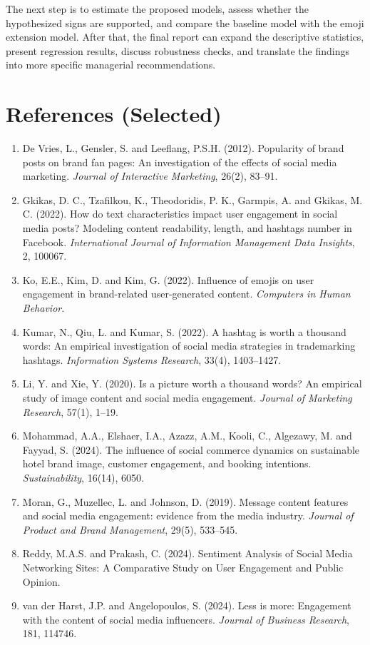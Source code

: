 \documentclass[12pt,a4paper]{ctexart}
\begin{document}
The next step is to estimate the proposed models, assess whether the hypothesized signs are supported, and compare the baseline model with the emoji extension model. After that, the final report can expand the descriptive statistics, present regression results, discuss robustness checks, and translate the findings into more specific managerial recommendations.

\section{References (Selected)}
\begin{enumerate}
    \item De Vries, L., Gensler, S. and Leeflang, P.S.H. (2012). Popularity of brand posts on brand fan pages: An investigation of the effects of social media marketing. \textit{Journal of Interactive Marketing}, 26(2), 83--91.
    \item Gkikas, D. C., Tzafilkou, K., Theodoridis, P. K., Garmpis, A. and Gkikas, M. C. (2022). How do text characteristics impact user engagement in social media posts? Modeling content readability, length, and hashtags number in Facebook. \textit{International Journal of Information Management Data Insights}, 2, 100067.
    \item Ko, E.E., Kim, D. and Kim, G. (2022). Influence of emojis on user engagement in brand-related user-generated content. \textit{Computers in Human Behavior}.
    \item Kumar, N., Qiu, L. and Kumar, S. (2022). A hashtag is worth a thousand words: An empirical investigation of social media strategies in trademarking hashtags. \textit{Information Systems Research}, 33(4), 1403--1427.
    \item Li, Y. and Xie, Y. (2020). Is a picture worth a thousand words? An empirical study of image content and social media engagement. \textit{Journal of Marketing Research}, 57(1), 1--19.
    \item Mohammad, A.A., Elshaer, I.A., Azazz, A.M., Kooli, C., Algezawy, M. and Fayyad, S. (2024). The influence of social commerce dynamics on sustainable hotel brand image, customer engagement, and booking intentions. \textit{Sustainability}, 16(14), 6050.
    \item Moran, G., Muzellec, L. and Johnson, D. (2019). Message content features and social media engagement: evidence from the media industry. \textit{Journal of Product and Brand Management}, 29(5), 533--545.
    \item Reddy, M.A.S. and Prakash, C. (2024). Sentiment Analysis of Social Media Networking Sites: A Comparative Study on User Engagement and Public Opinion.
    \item van der Harst, J.P. and Angelopoulos, S. (2024). Less is more: Engagement with the content of social media influencers. \textit{Journal of Business Research}, 181, 114746.
\end{enumerate}
\end{document}
